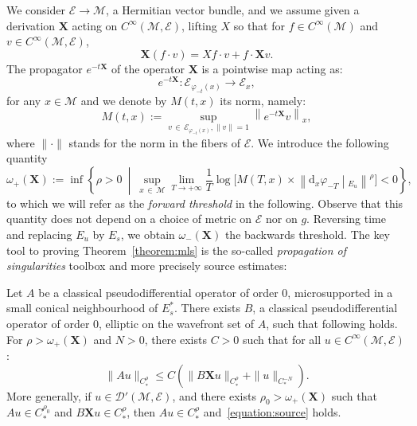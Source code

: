 \documentclass[AHL,Unicode,longabstracts,published]{cedram}
\newcommand{\X}{\mathbf{X}}
\newcommand{\M}{\mathcal{M}}
\newcommand{\E}{\mathcal{E}}
\newcommand{\clD}{\mathcal{D}}
\newcommand{\dd}{\mathrm{d}}
\begin{document}
We consider $\E\to\M$, a Hermitian vector bundle, and we assume given a derivation $\X$ acting on $C^\infty(\M,\E)$, lifting $X$ so that for $f\in C^\infty(\M)$ and $v\in C^\infty(\M,\E)$,
\begin{equation}\label{equation:lie}
\X(f \cdot v) = Xf \cdot v + f \cdot \X v.
\end{equation}
The propagator $e^{-t \X}$ of the operator $\X$ is a pointwise map acting as:
\[
e^{-t\X} : \E_{\varphi_{-t}(x)} \rightarrow \E_x,
\]
for any $x \in \M$ and we denote by $M(t,x)$ its norm, namely:
\[
M(t,x) := \sup_{v\,\in\,\E_{\varphi_{-t}(x)}, \|v\|=1} \left\|e^{-t\X} v\right\|_x,
\]
where $\|\cdot\|$ stands for the norm in the fibers of $\E$. We introduce the following quantity
\begin{equation}\label{equation:threshold}
\omega_+(\X) := \inf\left\{ \rho > 0~\middle|~\sup_{x\,\in\,\M} \lim_{T\to + \infty} \frac{1}{T}\log \Big[M(T,x) \times \left\| \dd_x \varphi_{-T}\middle|_{E_u} \right\|^\rho\Big] < 0 \right\},
\end{equation}
to which we will refer as the \emph{forward threshold} in the following. Observe that this quantity does not depend on a choice of metric on $\E$ nor on $g$. Reversing time and replacing $E_u$ by $E_s$, we obtain $\omega_-(\X)$ the backwards threshold. The key tool to proving Theorem~\ref{theorem:mls} is the so-called \emph{propagation of singularities} toolbox and more precisely source estimates:

\begin{theo}\label{theorem:source}
Let $A$ be a classical pseudodifferential operator of order $0$, microsupported in a small conical neighbourhood of $E^\ast_s$. There exists $B$, a classical pseudodifferential operator of order $0$, elliptic on the wavefront set of $A$, such that following holds. For $\rho>\omega_+(\X)$ and $N>0$, there exists $C>0$ such that for all $u\in C^\infty(\M,\E)$:
\begin{equation}\label{equation:source}
\| A u\|_{C^\rho_\ast} \leq C\left(\| B \X u \|_{C^\rho_\ast} + \| u \|_{C_*^{-N}}\right).
\end{equation}
More generally, if $u\in \clD'(\M,\E)$, and there exists $\rho_0 > \omega_+(\X)$ such that $Au \in C^{\rho_0}_\ast$ and $B \X u \in C^\rho_\ast$, then $A u \in C^{\rho}_\ast$ and~\eqref{equation:source} holds.
\end{theo}
\end{document}
